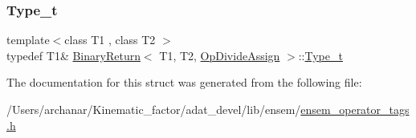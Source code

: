 \mbox{\label{structBinaryReturn_3_01T1_00_01T2_00_01OpDivideAssign_01_4_adc3c915034f321213a7e76979b881a0d}} 
\subsubsection{\texorpdfstring{Type\_t}{Type\_t}\hspace{0.1cm}{\footnotesize\ttfamily [2/2]}}
{\footnotesize\ttfamily template$<$class T1 , class T2 $>$ \\
typedef T1\& \mbox{\hyperlink{structBinaryReturn}{Binary\+Return}}$<$ T1, T2, \mbox{\hyperlink{structOpDivideAssign}{Op\+Divide\+Assign}} $>$\+::\mbox{\hyperlink{structBinaryReturn_3_01T1_00_01T2_00_01OpDivideAssign_01_4_adc3c915034f321213a7e76979b881a0d}{Type\+\_\+t}}}



The documentation for this struct was generated from the following file\+:\begin{DoxyCompactItemize}
\item 
/\+Users/archanar/\+Kinematic\+\_\+factor/adat\+\_\+devel/lib/ensem/\mbox{\hyperlink{lib_2ensem_2ensem__operator__tags_8h}{ensem\+\_\+operator\+\_\+tags.\+h}}\end{DoxyCompactItemize}
